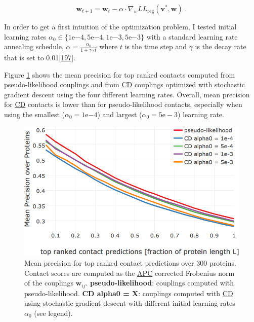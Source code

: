 \documentclass[11pt,a4paper,twoside]{book}
\newcommand{\eq}{\!=\!}
\newcommand{\LLreg}{L\!L_\mathrm{reg}}
\renewcommand{\v}{\mathbf{v}}
\newcommand{\w}{\mathbf{w}}
\newcommand{\wij}{\mathbf{w}_{ij}}
\theoremstyle{definition}
\theoremstyle{definition}
\theoremstyle{remark}
\begin{document}
\begin{equation}
  \w_{t+1} = \w_t - \alpha \cdot \nabla_w \LLreg(\v^*,\w) \; .
\end{equation}

In order to get a first intuition of the optimization problem, I tested
initial learning rates
\(\alpha_0 \in \{1\mathrm{e}{-4}, 5\mathrm{e}{-4}, 1\mathrm{e}{-3}, 5\mathrm{e}{-3}\}\)
with a standard learning rate annealing schedule,
\(\alpha = \frac{\alpha_0}{1 + \gamma \cdot t}\) where \(t\) is the time
step and \(\gamma\) is the decay rate that is set to
0.01{[}\protect\hyperlink{ref-Bottou2012}{197}{]}.

Figure \ref{fig:performance-cd-alphaopt} shows the mean precision for
top ranked contacts computed from pseudo-likelihood couplings and from
\protect\hyperlink{abbrev}{CD} couplings optimized with stochastic
gradient descent using the four different learning rates. Overall, mean
precision for \protect\hyperlink{abbrev}{CD} contacts is lower than for
pseudo-likelihood contacts, especially when using the smallest
(\(\alpha_0 \eq 1\mathrm{e}{-4}\)) and largest
(\(\alpha_0 \eq 5\mathrm{e-}{3}\)) learning rate.









\begin{figure}

{\centering \includegraphics[width=0.85\linewidth]{img/full_likelihood/sgd/precision_vs_rank_learning_rates} 

}

\caption{Mean precision for top ranked
contact predictions over 300 proteins. Contact scores are computed as
the \protect\hyperlink{abbrev}{APC} corrected Frobenius norm of the
couplings \(\wij\). \textbf{pseudo-likelihood}: couplings computed with
pseudo-likelihood. \textbf{CD alpha0 = X}: couplings computed with
\protect\hyperlink{abbrev}{CD} using stochastic gradient descent with
different initial learning rates \(\alpha_0\) (see legend).}\label{fig:performance-cd-alphaopt}
\end{figure}
\end{document}
